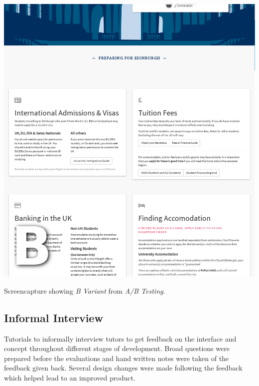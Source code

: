\documentclass[a4paper, notoc]{tufte-handout}
\begin{document}
\begin{marginfigure}
  \includegraphics[width=\linewidth]{bvariant.png}
  \caption{
    \label{fig:bvariant}
    Screencapture showing \textit{B Variant} from \textit{A/B Testing}.
  }

\end{marginfigure}

\subsection{Informal Interview}\label{subsec:interview}


Tutorials to informally interview tutors to get feedback on the interface and concept throughout different stages of development. Broad questions were prepared before the evaluations and hand written notes were taken of the feedback given back. Several design changes were made following the feedback which helped lead to an improved product.
\end{document}
